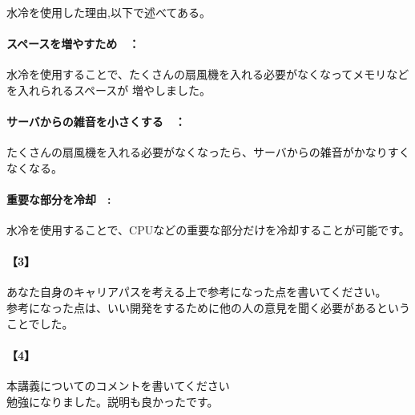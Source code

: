 \documentclass[20 pts]{article}
\begin{document}
\paragraph{}
水冷を使用した理由,以下で述べてある。
\paragraph{スペースを増やすため　：}
水冷を使用することで、たくさんの扇風機を入れる必要がなくなってメモリなどを入れられるスペースが
増やしました。

\paragraph{サーバからの雑音を小さくする　：}
たくさんの扇風機を入れる必要がなくなったら、サーバからの雑音がかなりすくなくなる。

\paragraph{重要な部分を冷却　:}
水冷を使用することで、CPUなどの重要な部分だけを冷却することが可能です。

\newpage
\paragraph{【3】}あなた自身のキャリアパスを考える上で参考になった点を書いてください。\\
参考になった点は、いい開発をするために他の人の意見を聞く必要があるということでした。



\paragraph{【4】}本講義についてのコメントを書いてください\\
勉強になりました。説明も良かったです。
\end{document}
